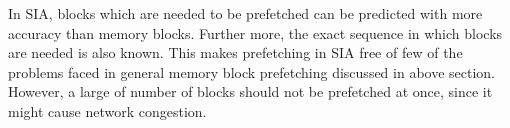 In SIA, blocks which are needed to be prefetched can be predicted with more accuracy
than memory blocks. Further more, the exact sequence in which blocks are needed is also known.
This makes prefetching in SIA free of few of the problems faced in general memory
block prefetching discussed in above section. However, a large of number of blocks
should not be prefetched at once, since it might cause network congestion.
